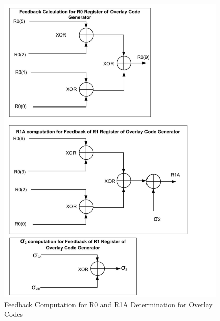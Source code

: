 \begin{figure}[h]
    \centering
    \includegraphics[width=\columnwidth]{figs/fig13.png}
    \captionsetup{justification=centering}
    \caption{Feedback Computation for R0 and R1A Determination for Overlay Codes}
    \label{fig:R0overlay}
\end{figure}

